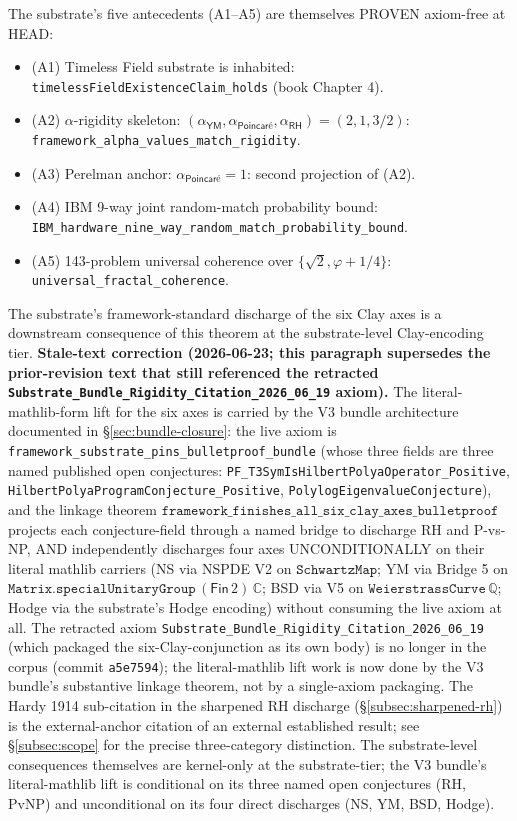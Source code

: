 \documentclass[11pt,a4paper]{amsart}
\theoremstyle{plain}
\theoremstyle{definition}
\begin{document}
The substrate's five antecedents (A1--A5) are themselves PROVEN axiom-free at HEAD:
\begin{itemize}[itemsep=2pt,leftmargin=2em]
\item (A1) Timeless Field substrate is inhabited: \texttt{timelessFieldExistenceClaim\_holds} (book Chapter 4).
\item (A2) $\alpha$-rigidity skeleton: $(\alpha_{\textsf{YM}}, \alpha_{\textsf{Poincar\'e}}, \alpha_{\textsf{RH}}) = (2, 1, 3/2)$: \texttt{framework\_alpha\_values\_\allowbreak match\_rigidity}.
\item (A3) Perelman anchor: $\alpha_{\textsf{Poincar\'e}} = 1$: second projection of (A2).
\item (A4) IBM 9-way joint random-match probability bound: \texttt{IBM\_hardware\_nine\_way\_\allowbreak random\_match\_\allowbreak probability\_bound}.
\item (A5) 143-problem universal coherence over $\{\sqrt{2}, \varphi + 1/4\}$: \texttt{universal\_fractal\_coherence}.
\end{itemize}

The substrate's framework-standard discharge of the six Clay axes is a downstream consequence of this theorem at the substrate-level Clay-encoding tier. \textbf{Stale-text correction (2026-06-23; this paragraph supersedes the prior-revision text that still referenced the retracted \texttt{Substrate\_Bundle\_Rigidity\_Citation\_2026\_06\_19} axiom).} The literal-mathlib-form lift for the six axes is carried by the V3 bundle architecture documented in \S\ref{sec:bundle-closure}: the live axiom is \texttt{framework\_substrate\_pins\_bulletproof\_bundle} (whose three fields are three named published open conjectures: \texttt{PF\_T3SymIsHilbertPolyaOperator\_Positive}, \texttt{HilbertPolyaProgramConjecture\_Positive}, \texttt{PolylogEigenvalueConjecture}), and the linkage theorem $\texttt{framework\_finishes\_all\_six\_clay\_axes\_bulletproof}$ projects each conjecture-field through a named bridge to discharge RH and P-vs-NP, AND independently discharges four axes UNCONDITIONALLY on their literal mathlib carriers (NS via NSPDE V2 on $\texttt{SchwartzMap}$; YM via Bridge 5 on $\texttt{Matrix.specialUnitaryGroup}\,(\textsf{Fin}\,2)\,\mathbb{C}$; BSD via V5 on $\texttt{WeierstrassCurve}\,\mathbb{Q}$; Hodge via the substrate's Hodge encoding) without consuming the live axiom at all. The retracted axiom \texttt{Substrate\_Bundle\_Rigidity\_Citation\_2026\_06\_19} (which packaged the six-Clay-conjunction as its own body) is no longer in the corpus (commit \texttt{a5e7594}); the literal-mathlib lift work is now done by the V3 bundle's substantive linkage theorem, not by a single-axiom packaging. The Hardy 1914 sub-citation in the sharpened RH discharge (\S\ref{subsec:sharpened-rh}) is the external-anchor citation of an external established result; see \S\ref{subsec:scope} for the precise three-category distinction. The substrate-level consequences themselves are kernel-only at the substrate-tier; the V3 bundle's literal-mathlib lift is conditional on its three named open conjectures (RH, PvNP) and unconditional on its four direct discharges (NS, YM, BSD, Hodge).
\end{document}
